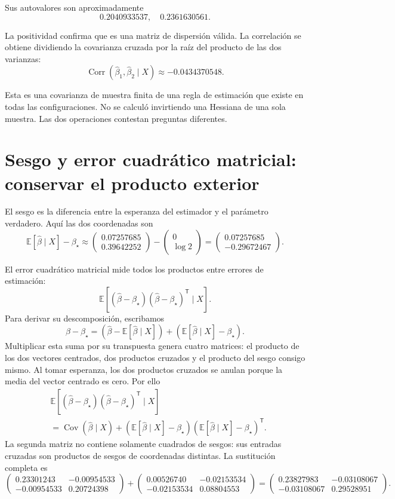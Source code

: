 \documentclass[11pt,a4paper]{article}
\newcommand{\E}{\mathbb E}
\newcommand{\T}{^{\mathsf T}}
\DeclareMathOperator{\Cov}{Cov}
\begin{document}
Sus autovalores son aproximadamente
\[
0.2040933537,\quad0.2361630561.
\]

La positividad confirma que es una matriz de dispersión válida.
La correlación se obtiene dividiendo la covarianza cruzada
por la raíz del producto de las dos varianzas:
\[
\operatorname{Corr}(\widehat\beta_1,\widehat\beta_2\mid X)\approx-0.0434370548.
\]

Esta es una covarianza de muestra finita de una regla
de estimación que existe en todas las configuraciones.
No se calculó invirtiendo una Hessiana de una sola muestra.
Las dos operaciones contestan preguntas diferentes.

\clearpage
\section{Sesgo y error cuadrático matricial: conservar el producto exterior}\label{logit144}
El sesgo es la diferencia entre la esperanza del estimador
y el parámetro verdadero. Aquí las dos coordenadas son
\[
\E[\widehat\beta\mid X]-\beta_\star\approx\begin{pmatrix}0.07257685\\0.39642252\end{pmatrix}-\begin{pmatrix}0\\\log2\end{pmatrix}=\begin{pmatrix}0.07257685\\-0.29672467\end{pmatrix}.
\]

El error cuadrático matricial mide todos los productos
entre errores de estimación:
\[
\E[(\widehat\beta-\beta_\star)
(\widehat\beta-\beta_\star)\T\mid X].
\]
Para derivar su descomposición, escribamos
\[
\widehat\beta-\beta_\star
=(\widehat\beta-\E[\widehat\beta\mid X])
+(\E[\widehat\beta\mid X]-\beta_\star).
\]
Multiplicar esta suma por su transpuesta genera cuatro
matrices: el producto de los dos vectores centrados,
dos productos cruzados y el producto del sesgo consigo mismo.
Al tomar esperanza, los dos productos cruzados se anulan
porque la media del vector centrado es cero.
Por ello
\[
\begin{aligned}
&\E[(\widehat\beta-\beta_\star)
(\widehat\beta-\beta_\star)\T\mid X]\\
&=\Cov(\widehat\beta\mid X)
+(\E[\widehat\beta\mid X]-\beta_\star)
(\E[\widehat\beta\mid X]-\beta_\star)\T.
\end{aligned}
\]
La segunda matriz no contiene solamente cuadrados
de sesgos: sus entradas cruzadas son productos de
sesgos de coordenadas distintas.
La sustitución completa es
\[
\begin{pmatrix}0.23301243&-0.00954533\\-0.00954533&0.20724398\end{pmatrix}+\begin{pmatrix}0.00526740&-0.02153534\\-0.02153534&0.08804553\end{pmatrix}=\begin{pmatrix}0.23827983&-0.03108067\\-0.03108067&0.29528951\end{pmatrix}.
\]
\end{document}
